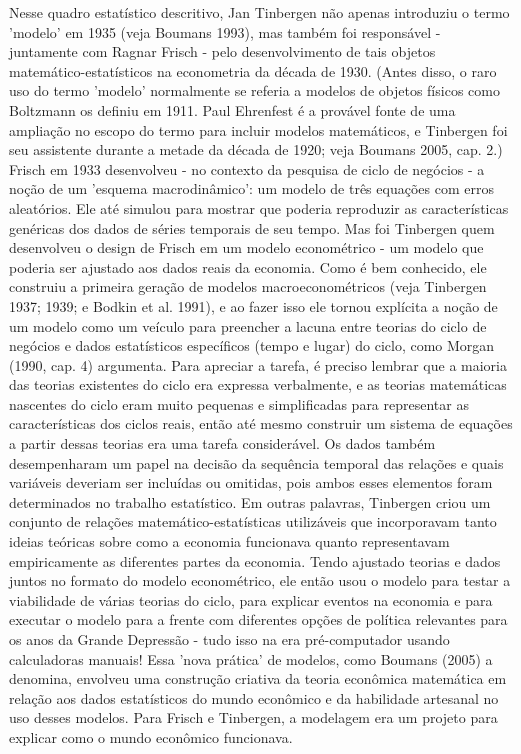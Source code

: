 \documentclass[a4paper,12pt]{article}[abntex2]
\begin{document}
Nesse quadro estatístico descritivo, Jan Tinbergen não apenas introduziu o termo 'modelo' em 1935 (veja Boumans 1993), mas também foi responsável - juntamente com Ragnar Frisch - pelo desenvolvimento de tais objetos matemático-estatísticos na econometria da década de 1930. (Antes disso, o raro uso do termo 'modelo' normalmente se referia a modelos de objetos físicos como Boltzmann os definiu em 1911. Paul Ehrenfest é a provável fonte de uma ampliação no escopo do termo para incluir modelos matemáticos, e Tinbergen foi seu assistente durante a metade da década de 1920; veja Boumans 2005, cap. 2.) Frisch em 1933 desenvolveu - no contexto da pesquisa de ciclo de negócios - a noção de um 'esquema macrodinâmico': um modelo de três equações com erros aleatórios. Ele até simulou para mostrar que poderia reproduzir as características genéricas dos dados de séries temporais de seu tempo. Mas foi Tinbergen quem desenvolveu o design de Frisch em um modelo econométrico - um modelo que poderia ser ajustado aos dados reais da economia. Como é bem conhecido, ele construiu a primeira geração de modelos macroeconométricos (veja Tinbergen 1937; 1939; e Bodkin et al. 1991), e ao fazer isso ele tornou explícita a noção de um modelo como um veículo para preencher a lacuna entre teorias do ciclo de negócios e dados estatísticos específicos (tempo e lugar) do ciclo, como Morgan (1990, cap. 4) argumenta. Para apreciar a tarefa, é preciso lembrar que a maioria das teorias existentes do ciclo era expressa verbalmente, e as teorias matemáticas nascentes do ciclo eram muito pequenas e simplificadas para representar as características dos ciclos reais, então até mesmo construir um sistema de equações a partir dessas teorias era uma tarefa considerável. Os dados também desempenharam um papel na decisão da sequência temporal das relações e quais variáveis deveriam ser incluídas ou omitidas, pois ambos esses elementos foram determinados no trabalho estatístico. Em outras palavras, Tinbergen criou um conjunto de relações matemático-estatísticas utilizáveis que incorporavam tanto ideias teóricas sobre como a economia funcionava quanto representavam empiricamente as diferentes partes da economia. Tendo ajustado teorias e dados juntos no formato do modelo econométrico, ele então usou o modelo para testar a viabilidade de várias teorias do ciclo, para explicar eventos na economia e para executar o modelo para a frente com diferentes opções de política relevantes para os anos da Grande Depressão - tudo isso na era pré-computador usando calculadoras manuais! Essa 'nova prática' de modelos, como Boumans (2005) a denomina, envolveu uma construção criativa da teoria econômica matemática em relação aos dados estatísticos do mundo econômico e da habilidade artesanal no uso desses modelos. Para Frisch e Tinbergen, a modelagem era um projeto para explicar como o mundo econômico funcionava.
\end{document}
